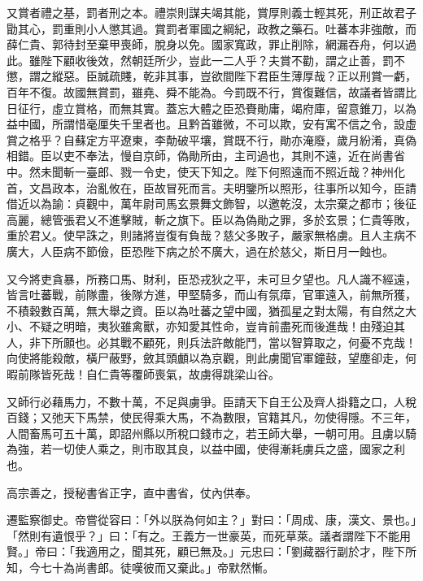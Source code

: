 \begin{pinyinscope}
 又賞者禮之基，罰者刑之本。禮崇則謀夫竭其能，賞厚則義士輕其死，刑正故君子勖其心，罰重則小人懲其過。賞罰者軍國之綱紀，政教之藥石。吐蕃本非強敵，而薛仁貴、郭待封至棄甲喪師，脫身以免。國家寬政，罪止削除，網漏吞舟，何以過此。雖陛下顧收後效，然朝廷所少，豈此一二人乎？夫賞不勸，謂之止善，罰不懲，謂之縱惡。臣誠疏賤，乾非其事，豈欲間陛下君臣生薄厚哉？正以刑賞一虧，百年不復。故國無賞罰，雖堯、舜不能為。今罰既不行，賞復難信，故議者皆謂比日征行，虛立賞格，而無其實。蓋忘大體之臣恐賚勛庸，竭府庫，留意錐刀，以為益中國，所謂惜毫厘失千里者也。且黔首雖微，不可以欺，安有寓不信之令，設虛賞之格乎？自蘇定方平遼東，李勣破平壤，賞既不行，勛亦淹廢，歲月紛淆，真偽相錯。臣以吏不奉法，慢自京師，偽勛所由，主司過也，其則不遠，近在尚書省中。然未聞斬一臺郎、戮一令史，使天下知之。陛下何照遠而不照近哉？神州化首，文昌政本，治亂攸在，臣故冒死而言。夫明鑒所以照形，往事所以知今，臣請借近以為諭：貞觀中，萬年尉司馬玄景舞文飾智，以邀乾沒，太宗棄之都市；後征高麗，總管張君乂不進擊賊，斬之旗下。臣以為偽勛之罪，多於玄景；仁貴等敗，重於君乂。使早誅之，則諸將豈復有負哉？慈父多敗子，嚴家無格虜。且人主病不廣大，人臣病不節儉，臣恐陛下病之於不廣大，過在於慈父，斯日月一蝕也。



 又今將吏貪暴，所務口馬、財利，臣恐戎狄之平，未可旦夕望也。凡人識不經遠，皆言吐蕃戰，前隊盡，後隊方進，甲堅騎多，而山有氛瘴，官軍遠入，前無所獲，不積穀數百萬，無大舉之資。臣以為吐蕃之望中國，猶孤星之對太陽，有自然之大小、不疑之明暗，夷狄雖禽獸，亦知愛其性命，豈肯前盡死而後進哉！由殘迫其人，非下所願也。必其戰不顧死，則兵法許敵能鬥，當以智算取之，何憂不克哉！向使將能殺敵，橫尸蔽野，斂其頭顱以為京觀，則此虜聞官軍鐘鼓，望塵卻走，何暇前隊皆死哉！自仁貴等覆師喪氣，故虜得跳梁山谷。



 又師行必藉馬力，不數十萬，不足與虜爭。臣請天下自王公及齊人掛籍之口，人稅百錢；又弛天下馬禁，使民得乘大馬，不為數限，官籍其凡，勿使得隱。不三年，人間畜馬可五十萬，即詔州縣以所稅口錢市之，若王師大舉，一朝可用。且虜以騎為強，若一切使人乘之，則市取其良，以益中國，使得漸耗虜兵之盛，國家之利也。



 高宗善之，授秘書省正字，直中書省，仗內供奉。



 遷監察御史。帝嘗從容曰：「外以朕為何如主？」對曰：「周成、康，漢文、景也。」「然則有遺恨乎？」曰：「有之。王義方一世豪英，而死草萊。議者謂陛下不能用賢。」帝曰：「我適用之，聞其死，顧已無及。」元忠曰：「劉藏器行副於才，陛下所知，今七十為尚書郎。徒嘆彼而又棄此。」帝默然慚。




\end{pinyinscope}
